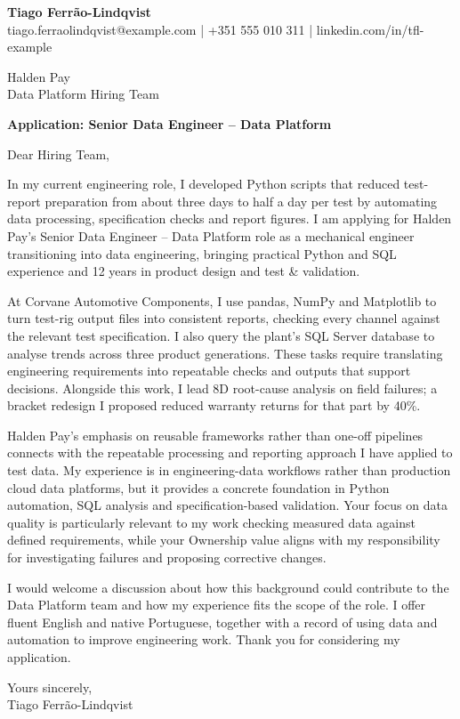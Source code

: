 \documentclass[11pt,a4paper]{article}
\begin{document}
{\Large\bfseries\color{primarycolor}Tiago Ferrão-Lindqvist}\\
{\small tiago.ferraolindqvist@example.com | +351 555 010 311 | linkedin.com/in/tfl-example}

Halden Pay\\
Data Platform Hiring Team

\textbf{Application: Senior Data Engineer – Data Platform}

Dear Hiring Team,

In my current engineering role, I developed Python scripts that reduced test-report preparation from about three days to half a day per test by automating data processing, specification checks and report figures. I am applying for Halden Pay's Senior Data Engineer – Data Platform role as a mechanical engineer transitioning into data engineering, bringing practical Python and SQL experience and 12 years in product design and test \& validation.

At Corvane Automotive Components, I use pandas, NumPy and Matplotlib to turn test-rig output files into consistent reports, checking every channel against the relevant test specification. I also query the plant's SQL Server database to analyse trends across three product generations. These tasks require translating engineering requirements into repeatable checks and outputs that support decisions. Alongside this work, I lead 8D root-cause analysis on field failures; a bracket redesign I proposed reduced warranty returns for that part by 40\%.

Halden Pay's emphasis on reusable frameworks rather than one-off pipelines connects with the repeatable processing and reporting approach I have applied to test data. My experience is in engineering-data workflows rather than production cloud data platforms, but it provides a concrete foundation in Python automation, SQL analysis and specification-based validation. Your focus on data quality is particularly relevant to my work checking measured data against defined requirements, while your Ownership value aligns with my responsibility for investigating failures and proposing corrective changes.

I would welcome a discussion about how this background could contribute to the Data Platform team and how my experience fits the scope of the role. I offer fluent English and native Portuguese, together with a record of using data and automation to improve engineering work. Thank you for considering my application.

Yours sincerely,\\
Tiago Ferrão-Lindqvist
\end{document}
